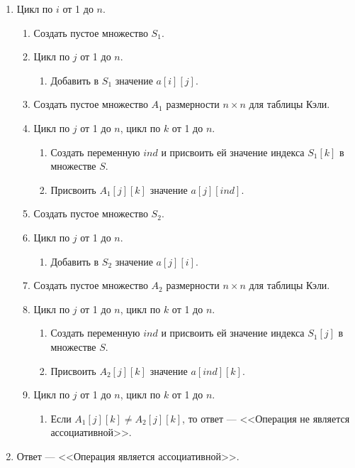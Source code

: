 \documentclass[bachelor, och, labwork]{shiza}
\begin{document}
\begin{enumerate}
    \item Цикл по $i$ от 1 до $n$.
        \begin{enumerate}
            \item Создать пустое множество $S_1$.
            \item Цикл по $j$ от 1 до $n$.
            \begin{enumerate}
                \item Добавить в $S_1$ значение $a[i][j]$.
            \end{enumerate}
            \item Создать пустое множество $A_1$ размерности $n\times n$ для таблицы Кэли.
            \item Цикл по $j$ от 1 до $n$, цикл по $k$ от 1 до $n$.
            \begin{enumerate}
                \item Создать переменную $ind$ и присвоить ей значение индекса
                $S_1[k]$ в множестве $S$.
                \item Присвоить $A_1[j][k]$ значение $a[j][ind]$.
            \end{enumerate}
            \item Создать пустое множество $S_2$.
            \item Цикл по $j$ от 1 до $n$.
            \begin{enumerate}
                \item Добавить в $S_2$ значение $a[j][i]$.
            \end{enumerate}
            \item Создать пустое множество $A_2$ размерности $n\times n$ для таблицы Кэли.
            \item Цикл по $j$ от 1 до $n$, цикл по $k$ от 1 до $n$.
            \begin{enumerate}
                \item Создать переменную $ind$ и присвоить ей значение индекса
                $S_1[j]$ в множестве $S$.
                \item Присвоить $A_2[j][k]$ значение $a[ind][k]$.
            \end{enumerate}
            \item Цикл по $j$ от 1 до $n$, цикл по $k$ от 1 до $n$.
            \begin{enumerate}
                \item Если $A_1[j][k]\not=A_2[j][k]$, то ответ --- <<Операция не 
                является ассоциативной>>.
            \end{enumerate}
        \end{enumerate}
    \item Ответ --- <<Операция является ассоциативной>>.
\end{enumerate}
\end{document}
